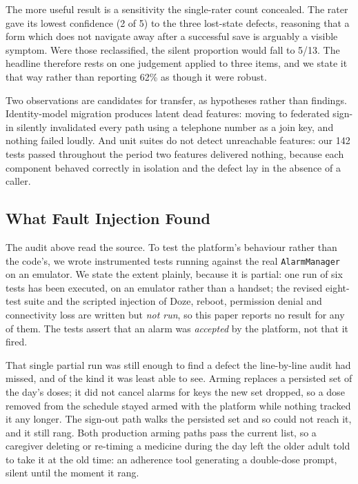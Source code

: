 \documentclass[runningheads,a4paper]{llncs}
\begin{document}
The more useful result is a sensitivity the single-rater count concealed. The rater gave its
lowest confidence (2 of 5) to the three lost-state defects, reasoning that a form which does
not navigate away after a successful save is arguably a visible symptom. Were those
reclassified, the silent proportion would fall to 5/13. The headline therefore rests on one
judgement applied to three items, and we state it that way rather than reporting 62\% as
though it were robust.

Two observations are candidates for transfer, as hypotheses rather than findings.
Identity-model migration produces latent dead features: moving to federated sign-in
silently invalidated every path using a telephone number as a join key, and nothing failed
loudly. And unit suites do not detect unreachable features: our 142 tests passed throughout
the period two features delivered nothing, because each component behaved correctly in
isolation and the defect lay in the absence of a caller.

\subsection{What Fault Injection Found}
\label{sec:faults}

The audit above read the source. To test the platform's behaviour rather than the code's, we
wrote instrumented tests running against the real \texttt{AlarmManager} on an emulator. We
state the extent plainly, because it is partial: one run of six tests has been executed, on
an emulator rather than a handset; the revised eight-test suite and the scripted injection
of Doze, reboot, permission denial and connectivity loss are written but \emph{not run}, so
this paper reports no result for any of them. The tests assert that an alarm was
\emph{accepted} by the platform, not that it fired.

That single partial run was still enough to find a defect the line-by-line audit had
missed, and of the kind it was least able to see. Arming replaces a persisted set of the
day's doses; it did not cancel alarms for keys the new set dropped, so a dose removed from
the schedule stayed armed with the platform while nothing tracked it any longer. The
sign-out path walks the persisted set and so could not reach it, and it still rang. Both
production arming paths pass the current list, so a caregiver deleting or re-timing a
medicine during the day left the older adult told to take it at the old time: an adherence
tool generating a double-dose prompt, silent until the moment it rang.
\end{document}
